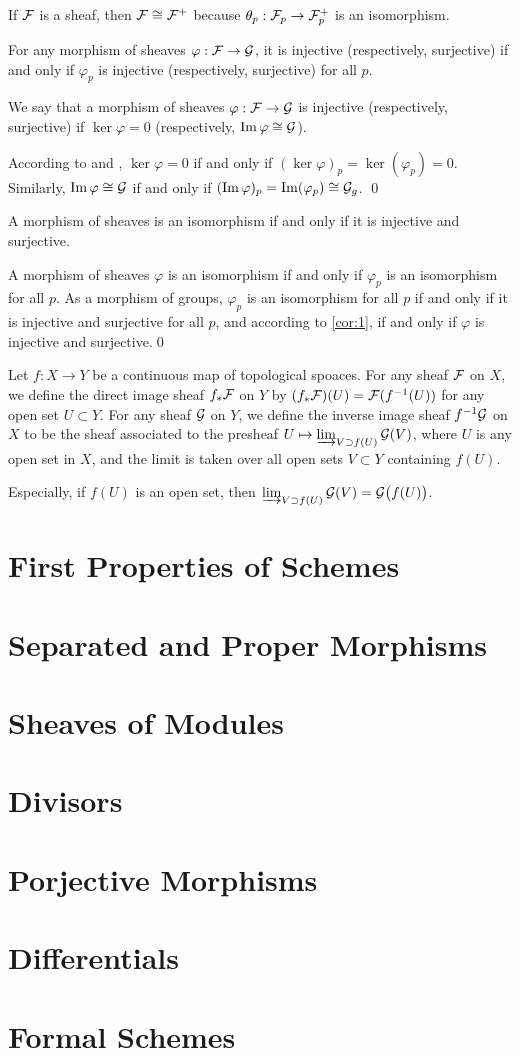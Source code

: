 \documentclass[10pt]{extbook}
\begin{document}
\para If $\mathcal{F}$ is a sheaf, then $\mathcal{F}\cong \mathcal{F}^+$ because 
$\theta_p:\mathcal{F}_p\to \mathcal{F}^+_p$ is an isomorphism.

\para  \label{cor:1} For any morphism of sheaves $\varphi:\mathcal{F}\to\mathcal{G}$, it is injective
(respectively, surjective) if and only if $\varphi_p$ is injective (respectively, 
surjective) for all $p$.

\para We say that a morphism of sheaves $\varphi:\mathcal{F}\to\mathcal{G}$ is injective (respectively, 
surjective) if $\ker\varphi=0$ (respectively, $\operatorname{Im}\varphi\cong\mathcal{G}$).

\proof According to  and , $\ker \varphi=0$ if and only if 
$(\ker \varphi)_p=\ker(\varphi_p)=0$. Similarly, $\operatorname{Im} \varphi\cong \mathcal{G}$ if and only 
if $(\operatorname{Im} \varphi)_p=\operatorname{Im}(\varphi_p)\cong \mathcal{G}_g$. \qed

\para A morphism of sheaves is an isomorphism if and only if it is injective and surjective.

\proof A morphism of sheaves $\varphi$ is an isomorphism if and only if $\varphi_p$ is 
an isomorphism for all $p$. As a morphism of groups, $\varphi_p$ is an isomorphism for 
all $p$ if and only if it is injective and surjective for all $p$, and according to 
\eqref{cor:1}, if and only if $\varphi$ is injective and surjective.\qed

\para Let $f:X\to Y$ be a continuous map of topological spoaces. For any sheaf $\mathcal{F}$ 
on $X$, we define the direct image sheaf $f_*\mathcal{F}$ on $Y$ by 
$(f_*\mathcal{F})(U)=\mathcal{F}(f^{-1}(U))$ for any open set $U\subset Y$. For any sheaf $\mathcal{G}$ on
 $Y$, we define the inverse image sheaf $f^{-1}\mathcal{G}$ on $X$ to be the sheaf associated 
 to the presheaf $U\mapsto \varinjlim_{V \supset f(U)}\mathcal{G}(V)$, where $U$ is any open 
 set in $X$, and the limit is taken over all open sets $V\subset Y$ containing $f(U)$. 

Especially, if $f(U)$ is an open set, then $\varinjlim_{V \supset f(U)}\mathcal{G}(V)=\mathcal{G}\bigl(f(U)\bigr)$.

\section{First Properties of Schemes}
\section{Separated and Proper Morphisms}
\section{Sheaves of Modules}
\section{Divisors}
\section{Porjective Morphisms}
\section{Differentials}
\section{Formal Schemes}
\end{document}
